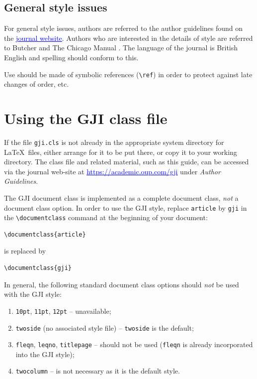 \documentclass{gji}
\begin{document}
\subsection{General style issues}

For general style issues, authors are referred to the author guidelines found on the \href{https://academic.oup.com/gji/pages/General_Instructions}{\textcolor{blue}{\underline{journal website}}}. Authors
who are interested in the details of style are referred to Butcher
 and The Chicago Manual . The language of
the journal is British English and spelling should conform to this.

Use should be made of symbolic references (\verb"\ref") in order to
protect against late changes of order, etc.


\section{Using the GJI class file}

If the file \verb"gji.cls" is not already in the appropriate
system directory for \LaTeX\ files, either arrange for it to be
put there, or copy it to your working directory. The class file
and related material, such as this guide, can be accessed via the
journal web-site  at
\href{https://academic.oup.com/gji}{\textcolor{blue}{\underline{https://academic.oup.com/gji}}} under {\em Author
Guidelines}.

The GJI document class is implemented as a complete document class, {\em
not\/} a document class option. In   order to use the GJI style, replace
\verb"article" by
\verb"gji" in the
\verb"\documentclass" command at the beginning of your document:
\begin{verbatim}
\documentclass{article}
\end{verbatim}
is replaced by
\begin{verbatim}
\documentclass{gji}
\end{verbatim}
In general, the following standard document class options should {\em
not\/} be used with the GJI style:
\begin{enumerate}
  \item \texttt{10pt}, \texttt{11pt}, \texttt{12pt} -- unavailable;
  \item \texttt{twoside} (no associated style file) --
     \texttt{twoside} is the default;
  \item \texttt{fleqn}, \texttt{leqno}, \texttt{titlepage} --
        should not be used (\verb"fleqn" is already incorporated into
        the GJI style);
  \item \texttt{twocolumn} -- is not necessary as it is the default style.
\end{enumerate}
\end{document}
